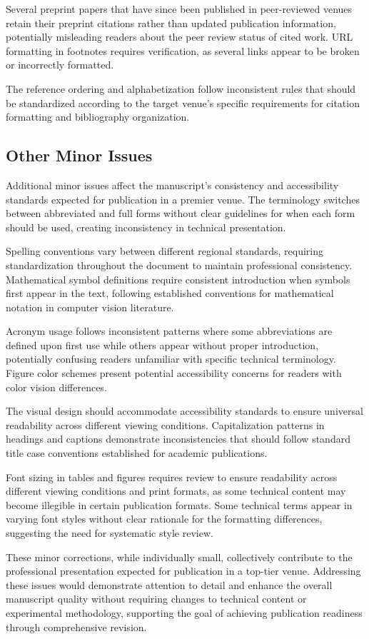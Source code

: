 Several preprint papers that have since been published in peer-reviewed venues retain their preprint citations rather than updated publication information, potentially misleading readers about the peer review status of cited work. URL formatting in footnotes requires verification, as several links appear to be broken or incorrectly formatted.

The reference ordering and alphabetization follow inconsistent rules that should be standardized according to the target venue's specific requirements for citation formatting and bibliography organization.

\subsection{Other Minor Issues}
Additional minor issues affect the manuscript's consistency and accessibility standards expected for publication in a premier venue. The terminology switches between abbreviated and full forms without clear guidelines for when each form should be used, creating inconsistency in technical presentation.

Spelling conventions vary between different regional standards, requiring standardization throughout the document to maintain professional consistency. Mathematical symbol definitions require consistent introduction when symbols first appear in the text, following established conventions for mathematical notation in computer vision literature.

Acronym usage follows inconsistent patterns where some abbreviations are defined upon first use while others appear without proper introduction, potentially confusing readers unfamiliar with specific technical terminology. Figure color schemes present potential accessibility concerns for readers with color vision differences.

The visual design should accommodate accessibility standards to ensure universal readability across different viewing conditions. Capitalization patterns in headings and captions demonstrate inconsistencies that should follow standard title case conventions established for academic publications.

Font sizing in tables and figures requires review to ensure readability across different viewing conditions and print formats, as some technical content may become illegible in certain publication formats. Some technical terms appear in varying font styles without clear rationale for the formatting differences, suggesting the need for systematic style review.

These minor corrections, while individually small, collectively contribute to the professional presentation expected for publication in a top-tier venue. Addressing these issues would demonstrate attention to detail and enhance the overall manuscript quality without requiring changes to technical content or experimental methodology, supporting the goal of achieving publication readiness through comprehensive revision.
